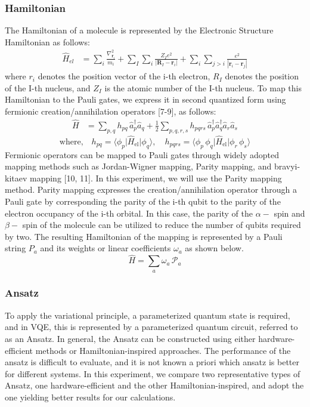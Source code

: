 \documentclass[pdflatex,sn-mathphys-num]{sn-jnl}%
\theoremstyle{thmstyleone}%
\theoremstyle{thmstyletwo}%
\theoremstyle{thmstylethree}%
\begin{document}
\subsubsection{Hamiltonian}\label{subsec2.2.1}
The Hamiltonian of a molecule is represented by the Electronic Structure Hamiltonian as follows:
\begin{align}
\hat{H}_{el} 
&= \sum_{i} \frac{\nabla_{\mathbf{r}_i}^2}{m_i}
+ \sum_{I} \sum_{i} \frac{Z_I e^2}{\left| \mathbf{R}_I - \mathbf{r}_i \right|}
+ \sum_{i} \sum_{j>i} \frac{e^2}{\left| \mathbf{r}_i - \mathbf{r}_j \right|}
\end{align}
where \(r_i\) denotes the position vector of the i-th electron, 
\(R_I\) denotes the position of the I-th nucleus, and \(Z_I\) is the atomic number of the I-th nucleus. 
To map this Hamiltonian to the Pauli gates, we express it in second quantized form using fermionic creation/annihilation operators [7-9], as follows:
\begin{align}
\hat{H} 
&= \sum_{p,q} h_{pq} \, \hat{a}_p^{\dagger} \hat{a}_q
+ \frac{1}{2} \sum_{p,q,r,s} h_{pqrs} \, \hat{a}_p^{\dagger} \hat{a}_q^{\dagger} \hat{a}_r \hat{a}_s
\end{align}
\begin{equation*}
\text{where,} \quad 
h_{pq} = \langle \phi_p \vert \hat{H}_{\mathrm{el}} \vert \phi_q \rangle, \quad
h_{pqrs} = \langle \phi_p \, \phi_q \vert \hat{H}_{\mathrm{el}} \vert \phi_r \, \phi_s \rangle
\end{equation*}
Fermionic operators can be mapped to Pauli gates through widely adopted mapping methods such as Jordan-Wigner mapping, Parity mapping, and bravyi-kitaev mapping [10, 11]. 
In this experiment, we will use the Parity mapping method. 
Parity mapping expresses the creation/annihilation operator through a Pauli gate by corresponding the parity of the i-th qubit to the parity of the electron occupancy of the i-th orbital. 
In this case, the parity of the \(\alpha-\) spin and \(\beta-\) spin of the molecule can be utilized to reduce the number of qubits required by two. 
The resulting Hamiltonian of the mapping is represented by a Pauli string \(P_a\) and its weights or linear coefficients \(\omega_a\) as shown below.
\begin{equation}
\hat{H} = \sum_{a} \omega_{a} \, \mathcal{P}_{a}
\end{equation}

\subsubsection{Ansatz}\label{subsec2.2.2}
To apply the variational principle, a parameterized quantum state is required, and in VQE, this is represented by a parameterized quantum circuit, 
referred to as an Ansatz. In general, the Ansatz can be constructed using either hardware-efficient methods or Hamiltonian-inspired approaches.
The performance of the ansatz is difficult to evaluate, and it is not known a priori which ansatz is better for different systems. 
In this experiment, we compare two representative types of Ansatz, one hardware-efficient and the other Hamiltonian-inspired, and adopt the one yielding better results for our calculations.
\end{document}
